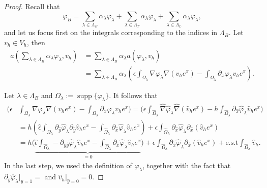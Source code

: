 \documentclass{article}
\newcommand{\est}{\text{\,e.s.t.}\xspace}
\DeclareMathOperator{\supp}{supp}
\newcommand{\summLA}[1][{}]{\ensuremath{\sum_{\lambda\in\Lambda_{#1}}\alpha_\lambda}}
\begin{document}
\begin{proof}
Recall that
\[\varphi_B = \summLA[B]\varphi_\lambda+ \summLA[T]\varphi_\lambda+
\summLA[L]\varphi_\lambda,\]
and let us focus first on the integrals corresponding to the indices in $\Lambda_B$. 
Let $v_h\in V_h$, then
\begin{equation*}
    \begin{aligned}
    a(\summLA[B] \varphi_\lambda,v_h) 
    &= \summLA[B] a(\varphi_\lambda,v_h)\\
    &=  \summLA[B]\left( \epsilon \int_{\Omega_\lambda} \nabla\varphi_\lambda \nabla (v_h e^x)
        - \int_{\Omega_\lambda} \partial_x \varphi_\lambda v_h e^x \right).
    \end{aligned}
\end{equation*}

Let $\lambda\in\Lambda_B$ and $\Omega_\lambda:=\supp\{\varphi_\lambda\}$. It follows that
\begin{equation*}
    \begin{aligned}
     \big( \epsilon &\int_{\Omega_\lambda}\nabla\varphi_\lambda \nabla (v_h e^x)
        - \int_{\Omega_\lambda}\partial_x \varphi_\lambda v_h e^x \big) 
        = \big( \epsilon \int_{\hat{\Omega}_\lambda}\hat{\nabla}\hat{\varphi}_\lambda\hat{\nabla}(\hat{v}_h e^x)
              - h \int_{\hat{\Omega}_\lambda} \partial_{\hat{x}} \hat{\varphi}_\lambda \hat{v}_h e^x   \big) \\
     &=  h(\hat{\epsilon} \int_{\hat{\Omega}_\lambda}\partial_{\hat{y}} \hat{\varphi}_\lambda\partial_{\hat{y}}\hat{v}_h e^x
              -  \int_{\hat{\Omega}_\lambda} \partial_{\hat{x}} \hat{\varphi}_\lambda \hat{v}_h e^x) + \epsilon \int_{\hat{\Omega}_\lambda}
                  \partial_{\hat{x}} \hat{\varphi}_\lambda\partial_{\hat{x}}(\hat{v}_he^x) \\
     &=  h\Big(\underbrace{\hat{\epsilon} \int_{\hat{\Omega}_\lambda}-\partial_{\hat{y}\hat{y}} \hat{\varphi}_\lambda\hat{v}_h e^x
              -  \int_{\hat{\Omega}_\lambda} \partial_{\hat{x}} \hat{\varphi}_\lambda \hat{v}_h e^x}_{=0}\Big) + \epsilon \int_{\hat{\Omega}_\lambda}
               \partial_{\hat{x}} \hat{\varphi}_\lambda\partial_{\hat{x}}(\hat{v}_he^x)  + \text{e.s.t}\int_{\hat{\Omega}_\lambda}\hat{v}_h.
    \end{aligned}
\end{equation*}
In the last step, we used the definition of $\varphi_\lambda$, together with the fact that $\partial_{\hat{y}}\hat{\varphi}_\lambda|_{\hat{y}=1} =$ \est and $\hat{v}_h|_{\hat{y}=0}=0$.


\end{proof}
\end{document}
